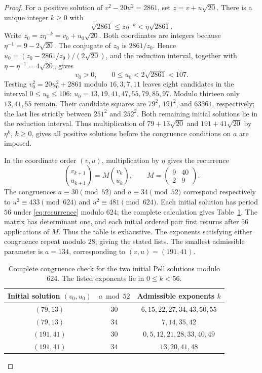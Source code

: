 \documentclass[draft]{publmathdeb}
\theoremstyle{remark}
\numberwithin{equation}{section}
\begin{document}
\begin{proof}
  For a positive solution of $v^2-20u^2=2861$, set $z=v+u\sqrt{20}$. There is a unique integer $k\geq0$ with
  \[
    \sqrt{2861}\leq z\eta^{-k}<\eta\sqrt{2861}.
  \]
  Write $z_0=z\eta^{-k}=v_0+u_0\sqrt{20}$. Both coordinates are integers because $\eta^{-1}=9-2\sqrt{20}$. The conjugate of $z_0$ is $2861/z_0$. Hence $u_0=(z_0-2861/z_0)/(2\sqrt{20})$, and the reduction interval, together with $\eta-\eta^{-1}=4\sqrt{20}$, gives
  \[
    v_0>0,\qquad 0\leq u_0<2\sqrt{2861}<107.
  \]
  Testing $v_0^2=20u_0^2+2861$ modulo $16,3,7,11$ leaves eight candidates in the interval $0\leq u_0\leq106$: $u_0=13,19,41,47,55,79,85,97$. Modulo thirteen only $13,41,55$ remain. Their candidate squares are $79^2$, $191^2$, and $63361$, respectively; the last lies strictly between $251^2$ and $252^2$. Both remaining initial solutions lie in the reduction interval. Thus multiplication of $79+13\sqrt{20}$ and $191+41\sqrt{20}$ by $\eta^k$, $k\geq0$, gives all positive solutions before the congruence conditions on $a$ are imposed.

  In the coordinate order $(v,u)$, multiplication by $\eta$ gives the recurrence
  \begin{equation}\label{eq:recurrence}
    \binom{v_{k+1}}{u_{k+1}}=
    M\binom{v_k}{u_k},\qquad
    M=\begin{pmatrix}9&40\\2&9\end{pmatrix}.
  \end{equation}
  The congruences $a\equiv30\pmod{52}$ and $a\equiv34\pmod{52}$ correspond respectively to $u^2\equiv433\pmod{624}$ and $u^2\equiv481\pmod{624}$. Each initial solution has period $56$ under \eqref{eq:recurrence} modulo $624$; the complete calculation gives Table~\ref{tab:pell}. The matrix has determinant one, and each initial ordered pair first returns after $56$ applications of $M$. Thus the table is exhaustive. The exponents satisfying either congruence repeat modulo $28$, giving the stated lists. The smallest admissible parameter is $a=134$, corresponding to $(v,u)=(191,41)$.

  \begin{table}[ht]
    \centering

    \begin{tabular}{ccc}
      \toprule
      Initial solution $(v_0,u_0)$ & $a\bmod52$ & Admissible exponents $k$ \\
      \midrule
      $(79,13)$                    & $30$       & $6,15,22,27,34,43,50,55$ \\
      $(79,13)$                    & $34$       & $7,14,35,42$             \\
      $(191,41)$                   & $30$       & $0,5,12,21,28,33,40,49$  \\
      $(191,41)$                   & $34$       & $13,20,41,48$            \\
      \bottomrule
    \end{tabular}
    \caption{Complete congruence check for the two initial Pell solutions modulo $624$. The listed exponents lie in $0\leq k<56$.}
    \label{tab:pell}
  \end{table}


\end{proof}
\end{document}
